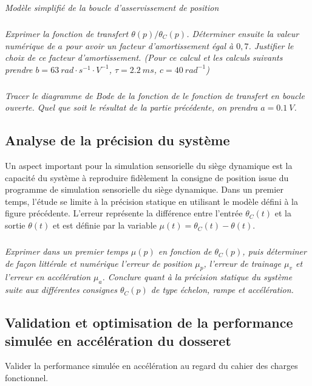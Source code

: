 \documentclass[10pt,fleqn]{article} %
\begin{document}
\begin{multicols}{2}
\begin{center}
\textit{Modèle simplifié de la boucle d'asservissement de
position \label{fig14}}
\end{center}


\subparagraph{}\textit{Exprimer la fonction de transfert $\theta(p)/\theta_C(p)$.
  Déterminer ensuite la valeur numérique de $a$ pour avoir un facteur
  d'amortissement égal à $0,7$. Justifier le choix de ce facteur
  d'amortissement. (Pour ce calcul et les calculs suivants prendre $b =
  \SI{63}{rad\cdot s^{-1}\cdot V^{-1}}$, $\tau= \SI{2,2}{ms}$, $c = \SI{40}{rad^{-1}}$)}
  
\subparagraph{}\textit{Tracer le diagramme de Bode de la fonction de le fonction de transfert en boucle ouverte. Quel que soit le résultat de la partie précédente, on prendra $a=\SI{0,1}{V}$.}

\subsection*{Analyse de la précision du système}

Un aspect important pour la simulation sensorielle du siège dynamique
est la capacité du système à reproduire fidèlement la consigne de
position issue du programme de simulation sensorielle du siège
dynamique. Dans un premier temps, l'étude se limite à la précision
statique en utilisant le modèle défini à la figure précédente. L'erreur
représente la différence entre l'entrée $\theta_C(t)$ et la
sortie $\theta(t)$ et est définie par la variable $\mu(t) = \theta_C(t)-\theta(t)$.


\subparagraph{}\textit{ Exprimer dans un premier temps $\mu(p)$ en fonction de
  $\theta_C(p)$, puis déterminer de façon littérale et numérique
  l'erreur de position $\mu_p$, l'erreur de trainage
  $\mu_v$ et l'erreur en accélération $\mu_a$.
  Conclure quant à la précision statique du système suite aux
  différentes consignes $\theta_C(p)$ de type échelon, rampe et
  accélération.}

\subsection*{Validation et optimisation de la performance simulée en
accélération du dosseret}

\begin{obj}
Valider la performance simulée en accélération au regard du cahier des
charges fonctionnel.
\end{obj}


\end{multicols}
\end{document}
